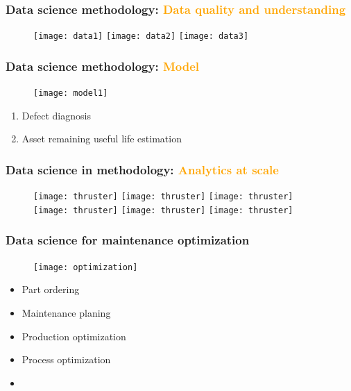 \documentclass{beamer}
\begin{document}
\begin{frame}
	\frametitle{Data science methodology: \textcolor{orange}{Data quality and understanding}}
\begin{figure}[H]
	\centering
	\texttt{[image: data1]}
	\texttt{[image: data2]}
	\texttt{[image: data3]}
\end{figure}
\end{frame}
\begin{frame}
	\frametitle{Data science methodology: \textcolor{orange}{Model}}
\begin{figure}[H]
	\centering
	\texttt{[image: model1]}
\end{figure}
\begin{enumerate}
	\item Defect diagnosis
	\item Asset remaining useful life estimation
\end{enumerate}
\end{frame}
\begin{frame}
	\frametitle{Data science in methodology: \textcolor{orange}{Analytics at scale}}
	\begin{figure}[H]
		\centering
		\texttt{[image: thruster]}
		\texttt{[image: thruster]}
		\texttt{[image: thruster]}
		\texttt{[image: thruster]}
		\texttt{[image: thruster]}
		\texttt{[image: thruster]}
	\end{figure}
\end{frame}


\begin{frame}
	\frametitle{Data science for maintenance optimization}
		\begin{figure}[H]
			\centering
			\texttt{[image: optimization]}
		\end{figure}
	\begin{itemize}
		\item Part ordering
		\item Maintenance planing
		\item Production optimization
		\item Process optimization
		\item
	\end{itemize}
\end{frame}
\end{document}
